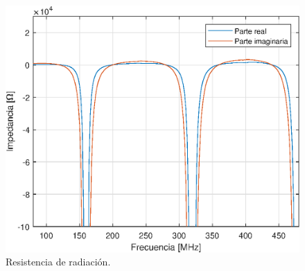\begin{figure}[H]
	\centering
	\includegraphics{imagenes/z.eps}
	\caption{Resistencia de radiación.}
	\label{fig.z_radiacion}
\end{figure}